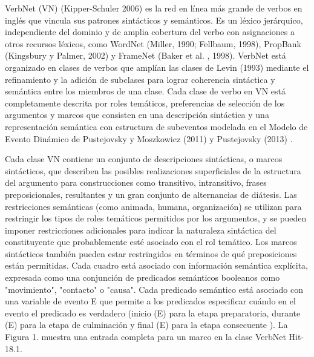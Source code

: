 VerbNet (VN) (Kipper-Schuler 2006) es la red en línea más grande de verbos en inglés que vincula sus patrones sintácticos y semánticos. Es un léxico jerárquico, independiente del dominio y de amplia cobertura del verbo con asignaciones a otros recursos léxicos, como WordNet (Miller, 1990; Fellbaum, 1998), PropBank (Kingsbury y Palmer, 2002) y FrameNet (Baker et al. , 1998). VerbNet está organizado en clases de verbos que amplían las clases de Levin (1993) mediante el refinamiento y la adición de subclases para lograr coherencia sintáctica y semántica entre los miembros de una clase. Cada clase de verbo en VN está completamente descrita por roles temáticos, preferencias de selección de los argumentos y marcos que consisten en una descripción sintáctica y una representación semántica con estructura de subeventos modelada en el Modelo de Evento Dinámico de Pustejovsky y Moszkowicz (2011) y Pustejovsky (2013) .

Cada clase VN contiene un conjunto de descripciones sintácticas, o marcos sintácticos, que describen las posibles realizaciones superficiales de la estructura del argumento para construcciones como transitivo, intransitivo, frases preposicionales, resultantes y un gran conjunto de alternancias de diátesis. Las restricciones semánticas (como animada, humana, organización) se utilizan para restringir los tipos de roles temáticos permitidos por los argumentos, y se pueden imponer restricciones adicionales para indicar la naturaleza sintáctica del constituyente que probablemente esté asociado con el rol temático. Los marcos sintácticos también pueden estar restringidos en términos de qué preposiciones están permitidas. Cada cuadro está asociado con información semántica explícita, expresada como una conjunción de predicados semánticos booleanos como "movimiento", "contacto" o "causa". Cada predicado semántico está asociado con una variable de evento E que permite a los predicados especificar cuándo en el evento el predicado es verdadero (inicio (E) para la etapa preparatoria, durante (E) para la etapa de culminación y final (E) para la etapa consecuente ). La Figura 1. muestra una entrada completa para un marco en la clase VerbNet Hit-18.1.

